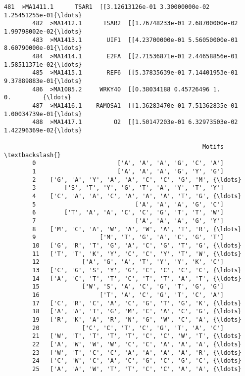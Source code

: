 \documentclass[11pt]{article}
\begin{document}
\begin{Verbatim}[commandchars=\\\{\}]
        481  >MA1411.1      TSAR1  [[3.12613126e-01 3.30000000e-02 1.25451255e-01{\ldots}   
        482  >MA1412.1      TSAR2  [[1.76748233e-01 2.68700000e-02 1.99798002e-02{\ldots}   
        483  >MA1413.1       UIF1  [[4.23700000e-01 5.56050000e-01 8.60790000e-01{\ldots}   
        484  >MA1414.1       E2FA  [[2.71536871e-01 2.44658856e-01 1.58511371e-02{\ldots}   
        485  >MA1415.1       REF6  [[5.37835639e-01 7.14401953e-01 9.37889883e-01{\ldots}   
        486  >MA1085.2     WRKY40  [[0.38034188 0.45726496 1.         0.         {\ldots}   
        487  >MA1416.1    RAMOSA1  [[1.36283470e-01 7.51362835e-01 1.00034739e-01{\ldots}   
        488  >MA1417.1         O2  [[1.50147203e-01 6.32973503e-02 1.42296369e-02{\ldots}   
        
                                                        Motifs  \textbackslash{}
        0                       ['A', 'A', 'A', 'G', 'C', 'A']   
        1                       ['A', 'A', 'A', 'G', 'Y', 'G']   
        2    ['G', 'A', 'Y', 'A', 'A', 'C', 'C', 'G', 'M', {\ldots}   
        3        ['S', 'T', 'Y', 'G', 'T', 'A', 'Y', 'T', 'Y']   
        4    ['C', 'A', 'A', 'C', 'A', 'A', 'A', 'T', 'G', {\ldots}   
        5                            ['A', 'A', 'A', 'G', 'C']   
        6        ['T', 'A', 'A', 'C', 'C', 'G', 'T', 'T', 'W']   
        7                            ['A', 'A', 'A', 'G', 'Y']   
        8    ['M', 'C', 'A', 'W', 'A', 'W', 'A', 'T', 'R', {\ldots}   
        9                  ['M', 'T', 'G', 'A', 'C', 'G', 'T']   
        10   ['G', 'R', 'T', 'G', 'A', 'C', 'G', 'T', 'G', {\ldots}   
        11   ['T', 'T', 'K', 'Y', 'C', 'C', 'Y', 'T', 'W', {\ldots}   
        12            ['A', 'G', 'A', 'T', 'Y', 'Y', 'K', 'C']   
        13   ['C', 'G', 'S', 'Y', 'G', 'C', 'C', 'C', 'C', {\ldots}   
        14   ['A', 'C', 'T', 'T', 'C', 'T', 'T', 'A', 'T', {\ldots}   
        15            ['W', 'S', 'A', 'C', 'G', 'T', 'G', 'G']   
        16                 ['T', 'A', 'C', 'G', 'T', 'C', 'A']   
        17   ['C', 'R', 'C', 'A', 'C', 'G', 'T', 'G', 'K', {\ldots}   
        18   ['A', 'A', 'T', 'G', 'M', 'C', 'A', 'C', 'G', {\ldots}   
        19   ['R', 'K', 'A', 'R', 'N', 'G', 'W', 'C', 'A', {\ldots}   
        20            ['C', 'C', 'T', 'C', 'G', 'T', 'A', 'C']   
        21   ['W', 'T', 'T', 'T', 'T', 'C', 'C', 'W', 'T', {\ldots}   
        22   ['A', 'W', 'W', 'W', 'C', 'C', 'A', 'A', 'A', {\ldots}   
        23   ['W', 'T', 'C', 'C', 'A', 'A', 'A', 'A', 'R', {\ldots}   
        24   ['C', 'W', 'C', 'A', 'C', 'G', 'C', 'G', 'C', {\ldots}   
        25   ['A', 'A', 'W', 'T', 'T', 'C', 'C', 'A', 'A', {\ldots}   

\end{Verbatim}
\end{document}
